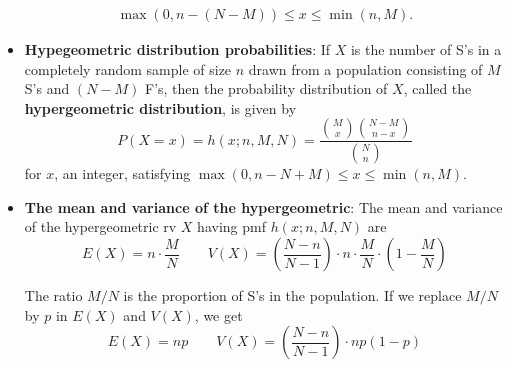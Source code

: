 \documentclass{report}
\begin{document}
\begin{itemize}
\begin{align*}
            \max (0, n - (N - M)) \leq x \leq \min (n, M)
        .\end{align*}
    \item \textbf{Hypegeometric distribution probabilities}:
        If $X$ is the number of S's in a completely random sample of size $n$ drawn from a population consisting of $M$ S's and $(N - M)$ F's, then the probability distribution of $X$, called the \textbf{hypergeometric distribution}, is given by
        \[
            P(X = x) = h(x; n, M, N) = \frac{\binom{M}{x} \binom{N - M}{n - x}}{\binom{N}{n}}
        \]
        for $x$, an integer, satisfying $\max (0, n - N + M) \leq x \leq \min (n, M)$.
    \item \textbf{The mean and variance of the hypergeometric}:
        The mean and variance of the hypergeometric rv $X$ having pmf $h(x; n, M, N)$ are
        \[
            E(X) = n \cdot \frac{M}{N} \qquad V(X) = \left( \frac{N - n}{N - 1} \right) \cdot n \cdot \frac{M}{N} \cdot \left( 1 - \frac{M}{N} \right)
        \]

        The ratio $M/N$ is the proportion of S's in the population. If we replace $M/N$ by $p$ in $E(X)$ and $V(X)$, we get
        \[
            E(X) = np \qquad V(X) = \left( \frac{N - n}{N - 1} \right) \cdot np(1 - p)
        \]


\end{itemize}
\end{document}
